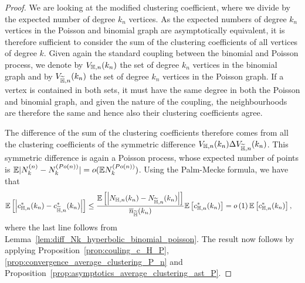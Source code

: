 \begin{proof}
We are looking at the modified clustering coefficient, where we divide by the expected number of degree $k_n$ vertices. As the expected numbers of degree $k_n$ vertices in the Poisson and binomial graph are asymptotically equivalent, it is therefore sufficient to consider the sum of the clustering coefficients of all vertices of degree $k$.
Given again the standard coupling between the binomial and Poisson process, we denote by $V_{\mathbb{H},n}(k_n)$ the set of degree $k_n$ vertices in the binomial graph and by $V_{\widetilde{\mathbb{H}},n}(k_n)$ the set of degree $k_n$ vertices in the Poisson graph. If a vertex is contained in both sets, it must have the same degree in both the Poisson and binomial graph, and given the nature of the coupling, the neighbourhoods are therefore the same and hence also their clustering coefficients agree.

The difference of the sum of the clustering coefficients therefore comes from all the clustering coefficients of the symmetric difference $V_{\mathbb{H},n}(k_n) \Delta V_{\widetilde{\mathbb{H}},n}(k_n)$. This symmetric difference is again a Poisson process, whose expected number of points is $\mathbb{E} | N_k^{(n)}-N_k^{(Po(n))}| = o(\mathbb{E} N_k^{(Po(n))})$. Using the Palm-Mecke formula, we have that
\begin{align*}
	\mathbb{E}\left[\left|c_{\mathbb{H},n}^\ast(k_n) - c_{\widetilde{\mathbb{H}},n}^\ast(k_n)\right|\right]
	&\le \frac{\mathbb{E}\left[\left|N_{\mathbb{H},n}(k_n)-N_{\widetilde{\mathbb{H}},n}(k_n)\right|\right]}{\overline{n}_{\widetilde{\mathbb{H}}}(k_n)} \mathbb{E}\left[c_{\mathbb{H},n}^\ast(k_n)\right]
	= o\left(1\right)\mathbb{E}\left[c_{\mathbb{H},n}^\ast(k_n)\right],
\end{align*}
where the last line follows from Lemma~\ref{lem:diff_Nk_hyperbolic_binomial_poisson}. The result now follows by applying Proposition~\ref{prop:couling_c_H_P}, \ref{prop:convergence_average_clustering_P_n} and Proposition~\ref{prop:asymptotics_average_clustering_ast_P}.
\end{proof}


